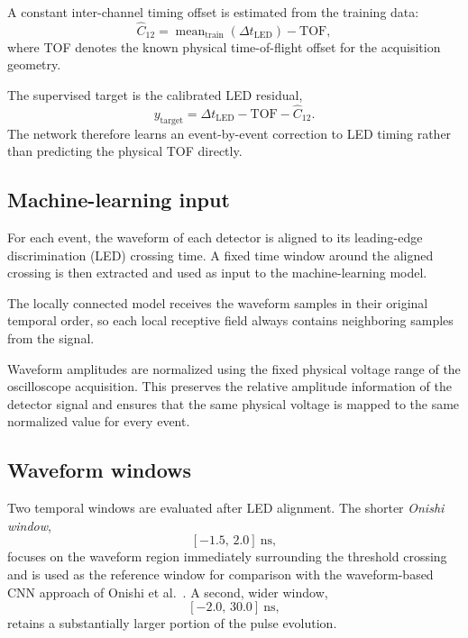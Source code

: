 A constant inter-channel timing offset is estimated from the training data:
\begin{equation}
    \widehat{C}_{12}
    =
    \operatorname{mean}_{\mathrm{train}}
    \left(\Delta t_{\mathrm{LED}}\right)
    -
    \mathrm{TOF},
\end{equation}
where TOF denotes the known physical time-of-flight offset for the acquisition geometry.

The supervised target is the calibrated LED residual,
\begin{equation}
    y_{\mathrm{target}}
    =
    \Delta t_{\mathrm{LED}}
    -
    \mathrm{TOF}
    -
    \widehat{C}_{12}.
\end{equation}
The network therefore learns an event-by-event correction to LED timing rather than predicting the physical TOF directly.

\subsection{Machine-learning input}

For each event, the waveform of each detector is aligned to its leading-edge discrimination (LED) crossing time. 
A fixed time window around the aligned crossing is then extracted and used as input to the machine-learning model.

The locally connected model receives the waveform samples in their original temporal order, so each local receptive field 
always contains neighboring samples from the signal.

Waveform amplitudes are normalized using the fixed physical voltage range of the oscilloscope acquisition. 
This preserves the relative amplitude information of the detector signal and ensures that the same physical voltage 
is mapped to the same normalized value for every event.

\subsection{Waveform windows}

Two temporal windows are evaluated after LED alignment. The shorter \emph{Onishi window},
\[
    [-1.5,\,2.0]~\mathrm{ns},
\]
focuses on the waveform region immediately surrounding the threshold crossing and is used as the reference window for comparison with the waveform-based CNN approach of Onishi et al.~\cite{onishi2022}. A second, wider window,
\[
    [-2.0,\,30.0]~\mathrm{ns},
\]
retains a substantially larger portion of the pulse evolution.

